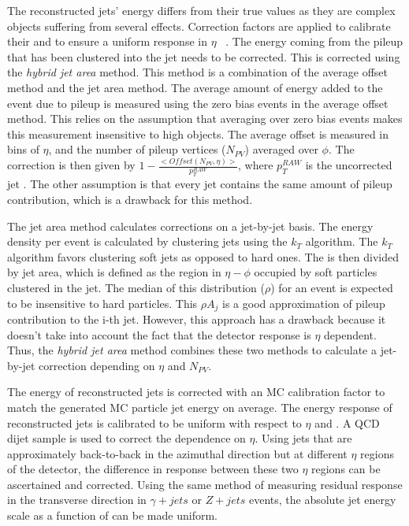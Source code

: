 The reconstructed jets' energy differs from their true values as they are complex objects suffering from several effects. Correction factors are applied to calibrate their \pt and to ensure a uniform response in $\eta$ ~\cite{Chatrchyan:2011ds, Khachatryan:2016kdb}. The energy coming from the pileup that has been clustered into the jet needs to be corrected. This is corrected using the \textit{hybrid jet area} method. This method is a combination of the average offset method and the jet area method. The average amount of energy added to the event due to pileup is measured using the zero bias events in the average offset method. This relies on the assumption that averaging over zero bias events makes this measurement insensitive to high \pt objects. The average offset is measured in bins of $\eta$, and the number of pileup vertices ($N_{PV}$) averaged over $\phi$. The correction is then given by $1-\frac{<Offset(N_{PV},\eta)>}{p_{T}^{RAW}}$, where $p_{T}^{RAW}$ is the uncorrected jet \pt. The other assumption is that every jet contains the same amount of pileup contribution, which is a drawback for this method.

The jet area method calculates corrections on a jet-by-jet basis. The energy density per event is calculated by clustering jets using the $k_{T}$ algorithm. The $k_{T}$ algorithm favors clustering soft jets as opposed to hard ones. The \pt is then divided by jet area, which is defined as the region in $\eta-\phi$ occupied by soft particles clustered in the jet. The median of this distribution ($\rho$) for an event is expected to be insensitive to hard particles. This $\rho A_{j}$ is a good approximation of pileup contribution to the i-th jet. However, this approach has a drawback because it doesn't take into account the fact that the detector response is $\eta$ dependent. Thus, the \textit{hybrid jet area} method combines these two methods to calculate a jet-by-jet correction depending on $\eta$ and $N_{PV}$.

The energy of reconstructed jets is corrected with an MC calibration factor to match the generated MC particle jet energy on average. The energy response of reconstructed jets is calibrated to be uniform with respect to $\eta$ and \pt. A QCD dijet sample is used to correct the dependence on $\eta$. Using jets that are approximately back-to-back in the azimuthal direction but at different $\eta$ regions of the detector, the difference in response between these two $\eta$ regions can be ascertained and corrected. Using the same method of measuring residual response in the transverse direction in $\gamma + jets$ or $Z +jets$ events, the absolute jet energy scale as a function of \pt can be made uniform.

